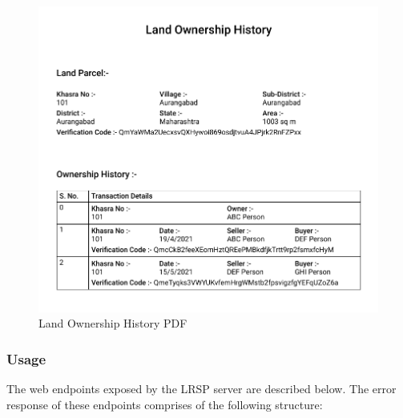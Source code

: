 \documentclass[12pt]{article}
\begin{document}
        \begin{figure}[H]
                \includegraphics[scale=0.5, frame]{landRecord.png}
                \centering
                \caption{Land Ownership History PDF}
                \label{fig:pdfreport}
        \end{figure}
        
        \subsubsection{Usage}
        The web endpoints exposed by the LRSP server are described below. \newline
        The error response of these endpoints comprises of the following structure: \newline
        
\end{document}
